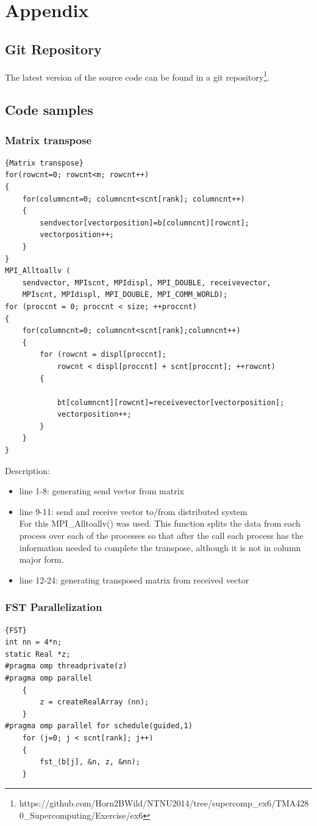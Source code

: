 \documentclass{article}
\begin{document}
\section{Appendix}
\subsection{Git Repository}
	The latest version of the source code can be found in a git repository\footnote{https://github.com/Horn2BWild/NTNU2014/tree/supercomp\_ex6/TMA4280\_Supercomputing/Exercise/ex6}.

\subsection{Code samples}
\subsubsection{Matrix transpose\label{matrixtranspose}}
\begin{lstlisting}[caption=Matrix transposition using MPI]{Matrix transpose}
for(rowcnt=0; rowcnt<m; rowcnt++)
{
    for(columncnt=0; columncnt<scnt[rank]; columncnt++)
    {
        sendvector[vectorposition]=b[columncnt][rowcnt];
        vectorposition++;
    }
}
MPI_Alltoallv (
    sendvector, MPIscnt, MPIdispl, MPI_DOUBLE, receivevector,
    MPIscnt, MPIdispl, MPI_DOUBLE, MPI_COMM_WORLD);
for (proccnt = 0; proccnt < size; ++proccnt)
{
    for(columncnt=0; columncnt<scnt[rank];columncnt++)
    {
        for (rowcnt = displ[proccnt]; 
        	rowcnt < displ[proccnt] + scnt[proccnt]; ++rowcnt)
        {

            bt[columncnt][rowcnt]=receivevector[vectorposition];
            vectorposition++;
        }
    }
}
\end{lstlisting}
Description:
\begin{itemize}
\item line 1-8: generating send vector from matrix
\item line 9-11: send and receive vector to/from distributed system\\
For this MPI\_Alltoallv() was used. This function splits the data from each process over each of the processes so that after the call each process has the information needed to complete the transpose, although it is not in column major form.
\item line 12-24: generating transposed matrix from received vector
\end{itemize}

\subsubsection{FST Parallelization \label{sub:fst}}
\begin{lstlisting}[caption=Parallelizing the FST function]{FST}
int nn = 4*n;
static Real *z;
#pragma omp threadprivate(z)
#pragma omp parallel
    {
        z = createRealArray (nn);
    }
#pragma omp parallel for schedule(guided,1)
    for (j=0; j < scnt[rank]; j++)
    {
        fst_(b[j], &n, z, &nn);
    }
\end{lstlisting}
\end{document}
